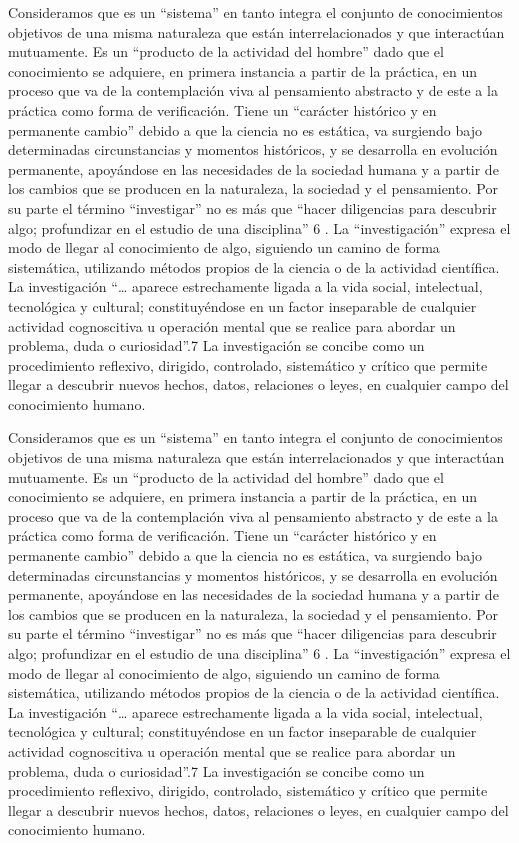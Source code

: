 \documentclass[12pt,]{krantz}
\theoremstyle{definition}
\theoremstyle{definition}
\theoremstyle{definition}
\theoremstyle{remark}
\begin{document}
Consideramos que es un ``sistema'' en tanto integra el conjunto de
conocimientos
objetivos
de
una
misma
naturaleza
que
están
interrelacionados y que interactúan mutuamente.
Es un ``producto de la actividad del hombre'' dado que el conocimiento
se adquiere, en primera instancia a partir de la práctica, en un proceso que
va de la contemplación viva al pensamiento abstracto y de este a la práctica
como forma de verificación.
Tiene un ``carácter histórico y en permanente cambio'' debido a que la
ciencia no es estática, va surgiendo bajo determinadas circunstancias y
momentos históricos, y se desarrolla en evolución permanente, apoyándose
en las necesidades de la sociedad humana y a partir de los cambios que se
producen en la naturaleza, la sociedad y el pensamiento.
Por su parte el término ``investigar'' no es más que ``hacer diligencias para
descubrir algo; profundizar en el estudio de una disciplina'' 6
.
La ``investigación''
expresa el modo de llegar al conocimiento de algo,
siguiendo un camino de forma sistemática, utilizando métodos propios de la
ciencia o de la actividad científica. La investigación ``\ldots{} aparece estrechamente
ligada a la vida social, intelectual, tecnológica y cultural; constituyéndose en un
factor inseparable de cualquier actividad cognoscitiva u operación mental que se
realice para abordar un problema, duda o curiosidad''.7
La investigación se concibe como un procedimiento reflexivo, dirigido,
controlado, sistemático y crítico que permite llegar a descubrir nuevos
hechos, datos, relaciones o leyes, en cualquier campo del conocimiento
humano.

Consideramos que es un ``sistema'' en tanto integra el conjunto de
conocimientos
objetivos
de
una
misma
naturaleza
que
están
interrelacionados y que interactúan mutuamente.
Es un ``producto de la actividad del hombre'' dado que el conocimiento
se adquiere, en primera instancia a partir de la práctica, en un proceso que
va de la contemplación viva al pensamiento abstracto y de este a la práctica
como forma de verificación.
Tiene un ``carácter histórico y en permanente cambio'' debido a que la
ciencia no es estática, va surgiendo bajo determinadas circunstancias y
momentos históricos, y se desarrolla en evolución permanente, apoyándose
en las necesidades de la sociedad humana y a partir de los cambios que se
producen en la naturaleza, la sociedad y el pensamiento.
Por su parte el término ``investigar'' no es más que ``hacer diligencias para
descubrir algo; profundizar en el estudio de una disciplina'' 6
.
La ``investigación''
expresa el modo de llegar al conocimiento de algo,
siguiendo un camino de forma sistemática, utilizando métodos propios de la
ciencia o de la actividad científica. La investigación ``\ldots{} aparece estrechamente
ligada a la vida social, intelectual, tecnológica y cultural; constituyéndose en un
factor inseparable de cualquier actividad cognoscitiva u operación mental que se
realice para abordar un problema, duda o curiosidad''.7
La investigación se concibe como un procedimiento reflexivo, dirigido,
controlado, sistemático y crítico que permite llegar a descubrir nuevos
hechos, datos, relaciones o leyes, en cualquier campo del conocimiento
humano.
\end{document}
